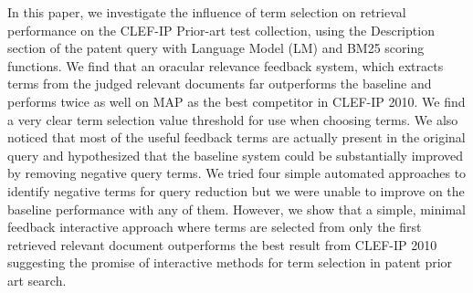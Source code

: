In this paper, we investigate the influence of term selection on retrieval
performance on the CLEF-IP Prior-art test collection, using the Description section of the patent query with Language Model (LM) and BM25 scoring functions. We find that an oracular relevance feedback system,
which extracts terms from the judged relevant documents far
outperforms the baseline and performs twice as well on MAP as the best
competitor in CLEF-IP 2010.  We find a very clear term selection value
threshold for use when choosing terms.  We also noticed that most of
the useful feedback terms are actually present in the original query
and hypothesized that the baseline system could be substantially
improved by removing negative query terms.
We tried four simple automated approaches to identify negative terms
for query reduction but we were unable to improve on the baseline
performance with any of them.  However, we show that a
simple, minimal feedback interactive approach where terms are selected
from only the first retrieved relevant document outperforms the best
result from CLEF-IP 2010 suggesting the promise of interactive methods
for term selection in patent prior art search.

\begin{comment}
We investigate the influence of term selection on retrieval performance on the CLEF-IP Prior Art test collection, starting with the Description section of the reference patent and using LM and BM25 scoring functions.    We find that an oracular relevance feedback system which extracts terms from the judged relevant documents far outperforms the baseline and  performs twice as well on MAP as the best competitor in CLEF-2014.  We find a very clear term selection value threshold for use when choosing terms.  A much more realistic approach in which feedback terms are extracted only from the first relevant document retrieved, still outperforms last year’s winner.   We noticed that most of the useful feedback terms are actually present in the original query and hypothesized that the baseline system could be substantially improved by removing negative query terms.  We tried three different approaches to identifying negative terms but were unable to improve on the baseline performance with any of them.
\end{comment}

